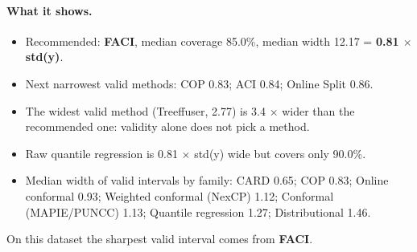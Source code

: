 \documentclass[11pt]{article}
\begin{document}
\paragraph{What it shows.}
\begin{itemize}
\item Recommended: \textbf{FACI}, median coverage 85.0\%, median width 12.17 = \textbf{0.81 $\times$ std(y)}.
\item Next narrowest valid methods: COP 0.83; ACI 0.84; Online Split 0.86.
\item The widest valid method (Treeffuser, 2.77) is 3.4 $\times$ wider than the recommended one: validity alone does not pick a method.
\item Raw quantile regression is 0.81 $\times$ std(y) wide but covers only 90.0\%.
\item Median width of valid intervals by family: CARD 0.65; COP 0.83; Online conformal 0.93; Weighted conformal (NexCP) 1.12; Conformal (MAPIE/PUNCC) 1.13; Quantile regression 1.27; Distributional 1.46.
\end{itemize}
\begin{insight}[Takeaway RQ5]
On this dataset the sharpest valid interval comes from \textbf{FACI}.
\end{insight}
\end{document}
